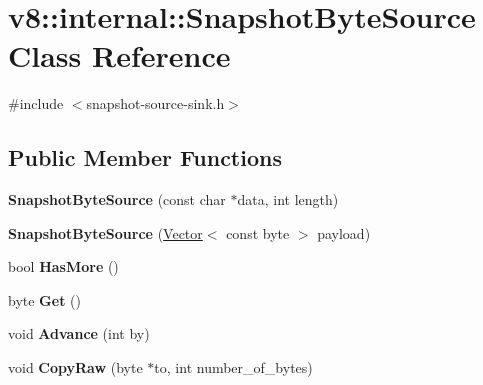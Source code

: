 \hypertarget{classv8_1_1internal_1_1_snapshot_byte_source}{}\section{v8\+:\+:internal\+:\+:Snapshot\+Byte\+Source Class Reference}
\label{classv8_1_1internal_1_1_snapshot_byte_source}


{\ttfamily \#include $<$snapshot-\/source-\/sink.\+h$>$}

\subsection*{Public Member Functions}
\begin{DoxyCompactItemize}
\item 
{\bfseries Snapshot\+Byte\+Source} (const char $\ast$data, int length)\hypertarget{classv8_1_1internal_1_1_snapshot_byte_source_aaec870afee9a0ee4db260e5d6d96871a}{}\label{classv8_1_1internal_1_1_snapshot_byte_source_aaec870afee9a0ee4db260e5d6d96871a}

\item 
{\bfseries Snapshot\+Byte\+Source} (\hyperlink{classv8_1_1internal_1_1_vector}{Vector}$<$ const byte $>$ payload)\hypertarget{classv8_1_1internal_1_1_snapshot_byte_source_a3ca81e1446facca52cb592dbe5b13a05}{}\label{classv8_1_1internal_1_1_snapshot_byte_source_a3ca81e1446facca52cb592dbe5b13a05}

\item 
bool {\bfseries Has\+More} ()\hypertarget{classv8_1_1internal_1_1_snapshot_byte_source_a957126cd1402ae66976d00619fbff992}{}\label{classv8_1_1internal_1_1_snapshot_byte_source_a957126cd1402ae66976d00619fbff992}

\item 
byte {\bfseries Get} ()\hypertarget{classv8_1_1internal_1_1_snapshot_byte_source_a02a021e250f8092eec60a678154941fa}{}\label{classv8_1_1internal_1_1_snapshot_byte_source_a02a021e250f8092eec60a678154941fa}

\item 
void {\bfseries Advance} (int by)\hypertarget{classv8_1_1internal_1_1_snapshot_byte_source_a0a711417dc223373cb5b3b6468ceb51a}{}\label{classv8_1_1internal_1_1_snapshot_byte_source_a0a711417dc223373cb5b3b6468ceb51a}

\item 
void {\bfseries Copy\+Raw} (byte $\ast$to, int number\+\_\+of\+\_\+bytes)\hypertarget{classv8_1_1internal_1_1_snapshot_byte_source_a562e8c45079d9b9f73e6e1f125414191}{}\label{classv8_1_1internal_1_1_snapshot_byte_source_a562e8c45079d9b9f73e6e1f125414191}


\end{DoxyCompactItemize}
